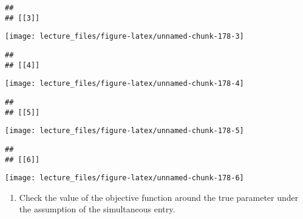\documentclass[
]{book}
\providecommand{\tightlist}{%
  \setlength{\itemsep}{0pt}\setlength{\parskip}{0pt}}
\begin{document}
\begin{verbatim}
## 
## [[3]]
\end{verbatim}

\begin{center}\texttt{[image: lecture\_files/figure-latex/unnamed-chunk-178-3]} \end{center}

\begin{verbatim}
## 
## [[4]]
\end{verbatim}

\begin{center}\texttt{[image: lecture\_files/figure-latex/unnamed-chunk-178-4]} \end{center}

\begin{verbatim}
## 
## [[5]]
\end{verbatim}

\begin{center}\texttt{[image: lecture\_files/figure-latex/unnamed-chunk-178-5]} \end{center}

\begin{verbatim}
## 
## [[6]]
\end{verbatim}

\begin{center}\texttt{[image: lecture\_files/figure-latex/unnamed-chunk-178-6]} \end{center}

\begin{enumerate}
\def\labelenumi{\arabic{enumi}.}
\setcounter{enumi}{4}
\tightlist
\item
  Check the value of the objective function around the true parameter under the assumption of the simultaneous entry.
\end{enumerate}
\end{document}
